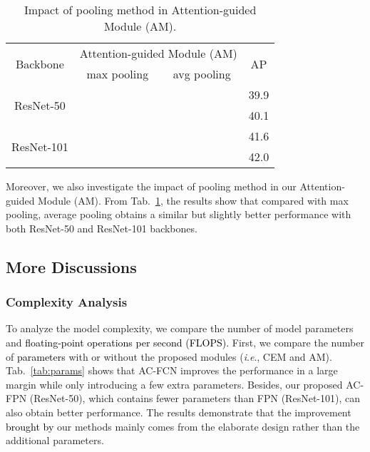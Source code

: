 \documentclass[journal]{IEEEtran}
\newcommand{\ie}{\textit{i}.\textit{e}.\xspace}
\def\myblue{\textcolor{black}}
\begin{document}
    \begin{table}[t]
      \centering
\caption{Impact of pooling method in Attention-guided Module (AM).}
        \begin{tabular}{c|cc|c}
        \toprule
        \multirow{2}{*}{Backbone} & \multicolumn{2}{c|}{Attention-guided Module (AM)} & \multirow{2}{*}{AP} \\
        \cline{2-3}          & max pooling & avg pooling &  \\
        \hline
        \multirow{2}{*}{ResNet-50} &      &       & 39.9 \\
              &       &      & 40.1  \\
\hline
        \multirow{2}{*}{ResNet-101} &     &       & 41.6 \\
              &       &      & 42.0 \\
        \bottomrule
        \end{tabular}\label{tab:pooling}\end{table}

    Moreover, we also investigate the impact of pooling method in our Attention-guided Module (AM). From Tab.~\ref{tab:pooling}, the results show that compared with max pooling, average pooling obtains a similar but slightly better performance with both ResNet-50 and ResNet-101 backbones.
	
	
	
	
	
	\subsection{More Discussions}
	
	\subsubsection{Complexity Analysis}
	
	
	
	To analyze the model complexity, we compare the number of model parameters and 
\myblue{floating-point operations per second (FLOPS).}
	First, we compare the number of \myblue{parameters} with or without the proposed modules (\ie, CEM and AM). 
Tab.~\ref{tab:params} shows that AC-FCN improves the performance in a large margin while only introducing a few extra parameters.
	Besides, our proposed AC-FPN (ResNet-50), which contains fewer parameters than FPN (ResNet-101), can also obtain better performance. The results demonstrate that the improvement \myblue{brought by} our methods mainly comes from the elaborate design rather than the additional parameters.
\end{document}
